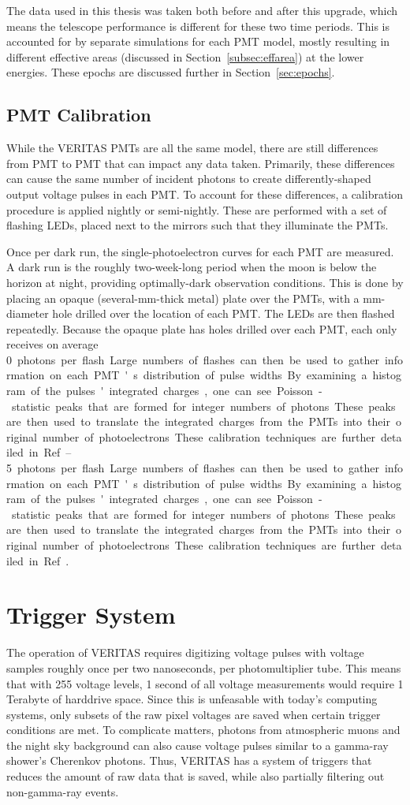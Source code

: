 The data used in this thesis was taken both before and after this upgrade, which means the telescope performance is different for these two time periods.
This is accounted for by separate simulations for each PMT model, mostly resulting in different effective areas (discussed in Section~\ref{subsec:effarea}) at the lower energies.
These epochs are discussed further in Section~\ref{sec:epochs}.


\subsection{PMT Calibration}

While the VERITAS PMTs are all the same model, there are still differences from PMT to PMT that can impact any data taken.
Primarily, these differences can cause the same number of incident photons to create differently-shaped output voltage pulses in each PMT.
To account for these differences, a calibration procedure is applied nightly or semi-nightly.
These are performed with a set of flashing LEDs, placed next to the mirrors such that they illuminate the PMTs.

Once per dark run, the single-photoelectron curves for each PMT are measured.
A dark run is the roughly two-week-long period when the moon is below the horizon at night, providing optimally-dark observation conditions.
This is done by placing an opaque (several-mm-thick metal) plate over the PMTs, with a mm-diameter hole drilled over the location of each PMT.
The LEDs are then flashed repeatedly.
Because the opaque plate has holes drilled over each PMT, each only receives on average \SIrange{0}{5} photons per flash.
Large numbers of flashes can then be used to gather information on each PMT's distribution of pulse widths.
By examining a histogram of the pulses' integrated charges, one can see Poisson-statistic peaks that are formed for integer numbers of photons.
These peaks are then used to translate the integrated charges from the PMTs into their original number of photoelectrons.
These calibration techniques are further detailed in Ref.~\cite{calib_techniques}.


\section{Trigger System}\label{sec:trig}

The operation of VERITAS requires digitizing voltage pulses with voltage samples roughly once per two nanoseconds, per photomultiplier tube.
This means that with 255 voltage levels, 1 second of all voltage measurements would require 1 Terabyte of harddrive space.
Since this is unfeasable with today's computing systems, only subsets of the raw pixel voltages are saved when certain trigger conditions are met.
To complicate matters, photons from atmospheric muons and the night sky background can also cause voltage pulses similar to a gamma-ray shower's Cherenkov photons.
Thus, VERITAS has a system of triggers that reduces the amount of raw data that is saved, while also partially filtering out non-gamma-ray events.

